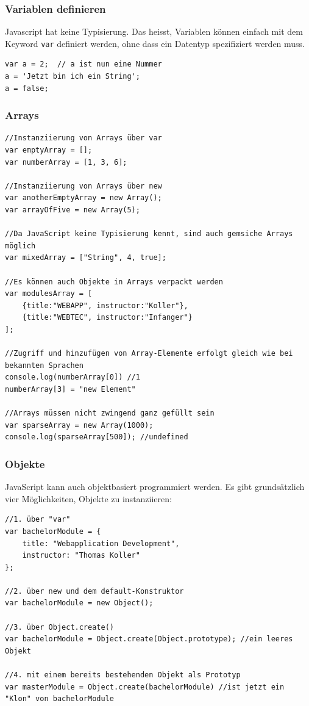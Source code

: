 \documentclass[a4paper, 11pt]{article}
\newcommand{\code}[1]{\texttt{#1}}
\begin{document}
\subsubsection{Variablen definieren}
Javascript hat keine Typisierung. Das heisst, Variablen können einfach mit dem Keyword \code{var} definiert werden, ohne dass ein Datentyp spezifiziert werden muss.

\begin{lstlisting}
var a = 2;  // a ist nun eine Nummer
a = 'Jetzt bin ich ein String';
a = false;
\end{lstlisting}

\subsubsection{Arrays}

\begin{lstlisting}
//Instanziierung von Arrays über var
var emptyArray = [];
var numberArray = [1, 3, 6];

//Instanziierung von Arrays über new
var anotherEmptyArray = new Array();
var arrayOfFive = new Array(5);

//Da JavaScript keine Typisierung kennt, sind auch gemsiche Arrays möglich
var mixedArray = ["String", 4, true];

//Es können auch Objekte in Arrays verpackt werden
var modulesArray = [
	{title:"WEBAPP", instructor:"Koller"}, 
	{title:"WEBTEC", instructor:"Infanger"}
];

//Zugriff und hinzufügen von Array-Elemente erfolgt gleich wie bei bekannten Sprachen
console.log(numberArray[0]) //1
numberArray[3] = "new Element"

//Arrays müssen nicht zwingend ganz gefüllt sein
var sparseArray = new Array(1000);
console.log(sparseArray[500]); //undefined
\end{lstlisting}

\subsubsection{Objekte}
JavaScript kann auch objektbasiert programmiert werden. Es gibt grundsätzlich vier Möglichkeiten, Objekte zu instanziieren:

\begin{lstlisting}
//1. über "var"
var bachelorModule = {
	title: "Webapplication Development",
	instructor: "Thomas Koller"
};

//2. über new und dem default-Konstruktor
var bachelorModule = new Object();

//3. über Object.create()
var bachelorModule = Object.create(Object.prototype); //ein leeres Objekt

//4. mit einem bereits bestehenden Objekt als Prototyp
var masterModule = Object.create(bachelorModule) //ist jetzt ein "Klon" von bachelorModule
\end{lstlisting}
\end{document}
